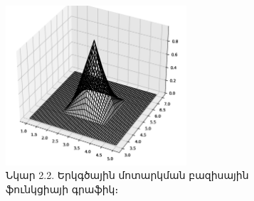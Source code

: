 \documentclass[fleqn, bachelor,subf,12pt,notitlepage]{article}
\begin{document}
\begin{figure}[H]
\centering
\includegraphics[width=0.6\textwidth]{images/bilinear_basis_function}
\captionsetup{labelformat=empty}
\caption{Նկար 2.2. Երկգծային մոտարկման բազիսային ֆունկցիայի գրաֆիկ։}
\end{figure}
\end{document}
